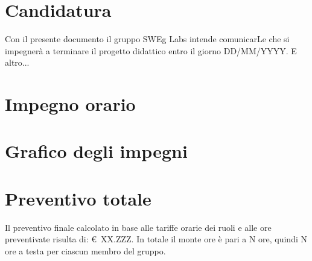 \documentclass{article}
\begin{document}



\clearpage

\clearpage

\tableofcontents
\newpage
\section{Candidatura}
Con il presente documento il gruppo SWEg Labs intende comunicarLe che si impegner\`a a terminare il progetto didattico entro il giorno DD/MM/YYYY.
E altro...

\section{Impegno orario}


\section{Grafico degli impegni}


\section{Preventivo totale}
Il preventivo finale calcolato in base alle tariffe orarie dei ruoli e alle ore preventivate risulta di: \euro~XX.ZZZ.
In totale il monte ore \`e pari a N ore, quindi N ore a testa per ciascun membro del gruppo.
\end{document}
